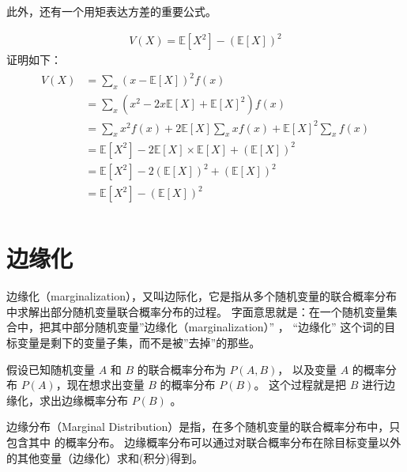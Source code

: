 \documentclass[letterpaper,10pt,english]{sphinxmanual}
\begin{document}
此外，还有一个用矩表达方差的重要公式。

\begin{sphinxShadowBox}
\begin{equation}\label{equation:概率基础/content:概率基础/content:50}
\begin{split}V(X) = \mathbb{E}[X^2] - (\mathbb{E}[X])^2\end{split}
\end{equation}
证明如下：
\begin{align}\label{equation:概率基础/content:概率基础/content:51}\!\begin{aligned}
V(X) &= \sum_x (x - \mathbb{E}[X])^2 f(x)\\
&= \sum_x (x^2 - 2x \mathbb{E}[X]  + \mathbb{E}[X]^2 ) f(x)\\
&= \sum_x x^2 f(x) + 2 \mathbb{E}[X] \sum_x xf(x) + \mathbb{E}[X]^2 \sum_x f(x)\\
&=  \mathbb{E}[X^2] - 2 \mathbb{E}[X] \times  \mathbb{E}[X] + (\mathbb{E}[X])^2\\
&=  \mathbb{E}[X^2] - 2 (\mathbb{E}[X])^2 + (\mathbb{E}[X])^2\\
&=  \mathbb{E}[X^2] -  (\mathbb{E}[X])^2\\
\end{aligned}\end{align}\end{sphinxShadowBox}


\section{边缘化}
\label{\detokenize{_u6982_u7387_u57fa_u7840/content:id16}}
\begin{sphinxShadowBox}

边缘化（marginalization），又叫边际化，它是指从多个随机变量的联合概率分布中求解出部分随机变量联合概率分布的过程。
字面意思就是：在一个随机变量集合中，把其中部分随机变量”边缘化（marginalization）” ，
“边缘化” 这个词的目标变量是剩下的变量子集，而不是被”去掉”的那些。
\end{sphinxShadowBox}

假设已知随机变量 \(A\) 和 \(B\) 的联合概率分布为 \(P(A,B)\)，
以及变量 \(A\) 的概率分布 \(P(A)\)，现在想求出变量 \(B\) 的概率分布 \(P(B)\)。
这个过程就是把 \(B\) 进行边缘化，求出边缘概率分布 \(P(B)\) 。

\begin{sphinxShadowBox}

边缘分布（Marginal Distribution）是指，在多个随机变量的联合概率分布中，只包含其中  的概率分布。
边缘概率分布可以通过对联合概率分布在除目标变量以外的其他变量（边缘化）求和(积分)得到。
\end{sphinxShadowBox}
\end{document}
